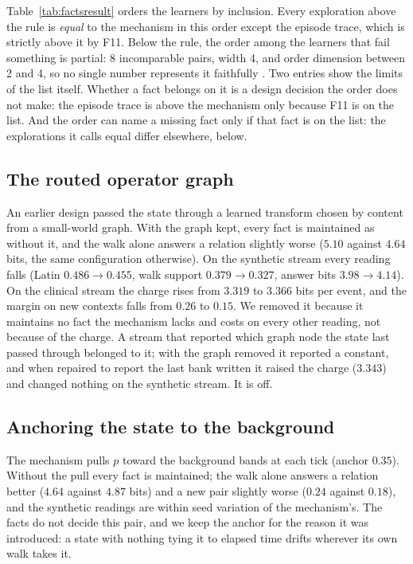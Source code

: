 \documentclass[11pt,a4paper]{article}
\theoremstyle{plain}
\theoremstyle{definition}
\theoremstyle{remark}
\begin{document}
Table~\ref{tab:factsresult} orders the learners by inclusion. Every exploration
above the rule is \emph{equal} to the mechanism in this order except the episode
trace, which is strictly above it by F11. Below the rule, the order among the
learners that fail something is partial: 8 incomparable pairs, width 4, and
order dimension between 2 and 4, so no single number represents it faithfully
\citep{dushnik1941partially}. Two entries show the limits of the list itself.
Whether a fact belongs on it is a design decision the order does not make: the
episode trace is above the mechanism only because F11 is on the list. And the
order can name a missing fact only if that fact is on the list: the
explorations it calls equal differ elsewhere, below.

\subsection{The routed operator graph}

An earlier design passed the state through a learned transform chosen by content
from a small-world graph. With the graph kept, every fact is maintained as
without it, and the walk alone answers a relation slightly worse ($5.10$ against
$4.64$ bits, the same configuration otherwise). On the synthetic stream every
reading falls (Latin $0.486\to0.455$, walk support $0.379\to0.327$, answer bits
$3.98\to4.14$). On the clinical stream the charge rises from $3.319$ to $3.366$
bits per event, and the margin on new contexts falls from $0.26$ to $0.15$. We
removed it because it maintains no fact the mechanism lacks and costs on every
other reading, not because of the charge. A stream that reported which graph
node the state last passed through belonged to it; with the graph removed it
reported a constant, and when repaired to report the last bank written it raised
the charge ($3.343$) and changed nothing on the synthetic stream. It is off.

\subsection{Anchoring the state to the background}

The mechanism pulls $p$ toward the background bands at each tick (anchor
$0.35$). Without the pull every fact is maintained; the walk alone answers a
relation better ($4.64$ against $4.87$ bits) and a new pair slightly worse
($0.24$ against $0.18$), and the synthetic readings are within seed variation
of the mechanism's. The facts do not decide this pair, and we keep the anchor
for the reason it was introduced: a state with nothing tying it to elapsed time
drifts wherever its own walk takes it.
\end{document}
